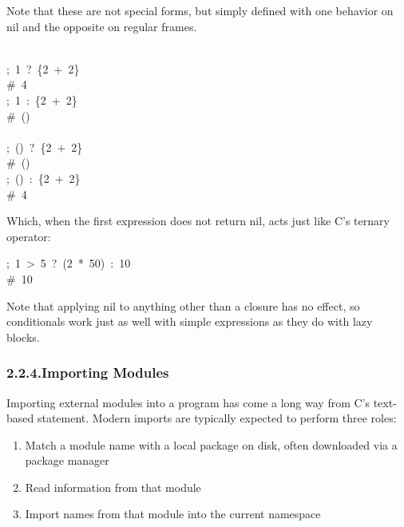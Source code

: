 \documentclass[preprint]{{acmart}}
\begin{document}
Note that these are not special forms, but simply defined with one behavior on nil
and the opposite on regular frames.%
\begin{mdpre}%
\noindent\\
;~1~{?}~\{2~+~2\}\\
{\#~4}\\
;~1~{:}~\{2~+~2\}\\
{\#~()}\\
\\
;~()~{?}~\{2~+~2\}\\
{\#~()}\\
;~()~{:}~\{2~+~2\}\\
{\#~4}%
\end{mdpre}\noindent{}Which, when the first expression does not return nil, acts just like C's ternary
operator:
\begin{mdpre}%
\noindent;~1~\textgreater{}~5~{?}~(2~*~{50})~{:}~{10}\\
{\#~10}%
\end{mdpre}\noindent{}Note that applying nil to anything other than a closure has no effect, so
conditionals work just as well with simple expressions as they do with
lazy blocks.

\subsubsection{2.2.4.\hspace*{0.5em}Importing Modules}\label{sec-importing-modules}%

\noindent{}Importing external modules into a program has come a long way from C's
text-based  statement. Modern imports are typically expected
to perform three roles:%

\begin{enumerate}[noitemsep,topsep=\mdcompacttopsep]%

\item{}Match a module name with a local package on disk, often downloaded via
a package manager%

\item{}Read information from that module%

\item{}Import names from that module into the current namespace%
\end{enumerate}%
\end{document}
